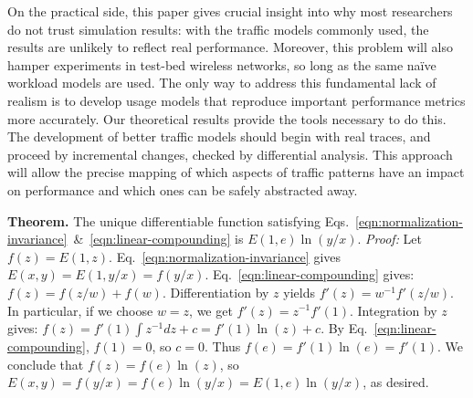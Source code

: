 \documentclass[conference]{IEEEtran}
\newcommand{\E}[1]{\left<#1\right>}
\newcommand{\abs}[1]{\left|#1\right|}
\begin{document}
On the practical side, this paper gives crucial insight into why most researchers do not trust simulation results: with the traffic models commonly used, the results are unlikely to reflect real performance. Moreover, this problem will also hamper experiments in test-bed wireless networks, so long as the same na\"ive workload models are used. The only way to address this fundamental lack of realism is to develop usage models that reproduce important performance metrics more accurately. Our theoretical results provide the tools necessary to do this. The development of better traffic models should begin with real traces, and proceed by incremental changes, checked by differential analysis.
This approach will allow the precise mapping of which aspects of traffic patterns have an impact on performance and which ones can be safely abstracted away.


\vspace{-0.5em}
\appendix\footnotesize

\noindent
\textbf{Theorem.} The unique differentiable function satisfying Eqs.~\ref{eqn:normalization-invariance}~\&~\ref{eqn:linear-compounding} is $E(1,e) \ln(y/x)$. \textit{Proof:} Let $f(z) = E(1,z)$. Eq.~\ref{eqn:normalization-invariance} gives $E(x,y) = E(1,y/x) = f(y/x)$. Eq.~\ref{eqn:linear-compounding} gives: $f(z) = f(z/w) + f(w)$. Differentiation by $z$ yields $f'(z) = w^{-1} f'(z/w)$. In particular, if we choose $w=z$, we get $f'(z) = z^{-1} f'(1)$. Integration by $z$ gives:
$f(z) = f'(1) \int z^{-1} dz + c = f'(1) \ln(z) + c$.
By Eq.~\ref{eqn:linear-compounding}, $f(1)=0$, so $c=0$. Thus $f(e)=f'(1)\ln(e)=f'(1)$. We conclude that $f(z)=f(e)\ln(z)$, so $E(x,y) = f(y/x) = f(e)\ln(y/x) = E(1,e)\ln(y/x)$, as desired.\hfill\QED

\end{document}
